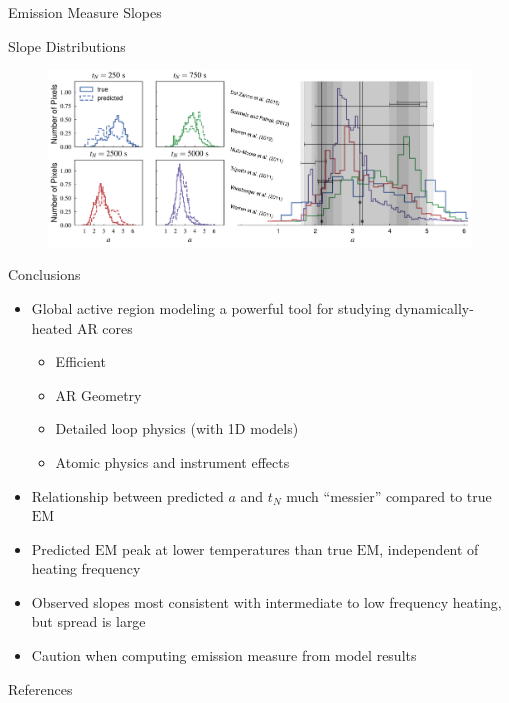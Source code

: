 \documentclass[final]{beamer}
\begin{document}
\begin{frame}
\begin{columns}[T]
\begin{column}{0.49\linewidth}
\begin{block}{Emission Measure Slopes}
\begin{figure}
      \end{figure}
    \end{block}
    \begin{block}{Slope Distributions}
      \begin{figure}
        \includegraphics[width=\columnwidth]{figures/slope_distributions.pdf}
      \end{figure}
    \end{block}
    \begin{block}{Conclusions}
      \begin{itemize}
        \item Global active region modeling a powerful tool for studying dynamically-heated AR cores
        \begin{itemize}
          \item Efficient
          \item AR Geometry
          \item Detailed loop physics (with 1D models)
          \item Atomic physics and instrument effects
        \end{itemize}
        \item Relationship between predicted $a$ and $t_N$ much ``messier'' compared to true $\mathrm{EM}$
        \item Predicted $\mathrm{EM}$ peak at lower temperatures than true $\mathrm{EM}$, independent of heating frequency
        \item Observed slopes most consistent with intermediate to low frequency heating, but spread is large
        \item Caution when computing emission measure from model results
      \end{itemize}
    \end{block}
    \begin{block}{References}
      \scriptsize
      \begin{multicols}{2}
        
        
      \end{multicols}
    \end{block}
  \end{column}
  \end{columns}
\end{frame}
\end{document}
